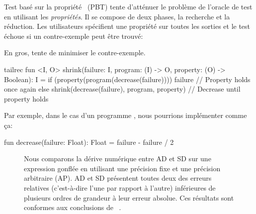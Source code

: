 Test basé sur la propriété~\citep{fink1997property} (PBT) tente d'atténuer le problème de l'oracle de test en utilisant les \textit{propriétés}. Il se compose de deux phases, la recherche et la réduction. Les utilisateurs spécifient une propriété sur toutes les sorties et le test échoue si un contre-exemple peut être trouvé:
%
%
En gros,  tente de minimiser le contre-exemple.
%
\begin{kotlinlisting}
tailrec fun <I, O> shrink(failure: I, program: (I) -> O, property: (O) -> Boolean): I =
    if (property(program(decrease(failure)))) failure // Property holds once again
    else shrink(decrease(failure), program, property) // Decrease until property holds
\end{kotlinlisting}
%
Par exemple, dans le cas d'un programme , nous pourrions implémenter  comme ça:
%
\begin{kotlinlisting}
fun decrease(failure: Float): Float = failure - failure / 2
\end{kotlinlisting}
%
\begin{figure}
\caption{Nous comparons la dérive numérique entre AD et SD sur une expression gonflée en utilisant une précision fixe et une précision arbitraire (AP). AD et SD présentent toutes deux des erreurs relatives (c'est-à-dire l'une par rapport à l'autre) inférieures de plusieurs ordres de grandeur à leur erreur absolue. Ces résultats sont conformes aux conclusions de ~\citet{laue2019equivalence}.\vspace{-10pt}}
\label{fig:pbt_comparison}
\end{figure}
